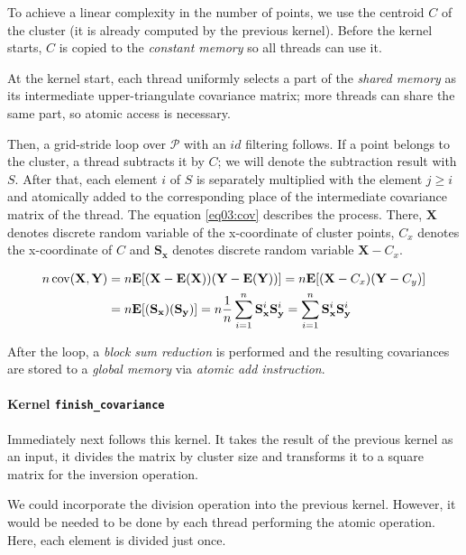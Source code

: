 To achieve a linear complexity in the number of points, we use the centroid $C$ of the cluster (it is already computed by the previous kernel). Before the kernel starts, $C$ is copied to the \emph{constant memory} so all threads can use it.

At the kernel start, each thread uniformly selects a part of the \emph{shared memory} as its intermediate upper-triangulate covariance matrix; more threads can share the same part, so atomic access is necessary.

Then, a grid-stride loop over $\mathcal{P}$ with an $id$ filtering follows. If a point belongs to the cluster, a thread subtracts it by $C$; we will denote the subtraction result with $S$. After that, each element $i$ of $S$ is separately multiplied with the element $j \ge i$ and atomically added to the corresponding place of the intermediate covariance matrix of the thread. The equation \ref{eq03:cov} describes the process. There, $\textbf{X}$ denotes discrete random variable of the x-coordinate of cluster points, $C_x$ denotes the x-coordinate of $C$ and $\mathbf{S_x}$ denotes discrete random variable $\mathbf{X}-C_x$.

\begin{equation}
\begin{split}
n\operatorname{cov}(\mathbf{X},\mathbf{Y}) &= n\mathbf{E}[(\mathbf{X}-\mathbf{E}(\mathbf{X}))(\mathbf{Y}-\mathbf{E}(\mathbf{Y}))] = n\mathbf{E}[(\mathbf{X}-C_x)(\mathbf{Y}-C_y)] \\ &= n\mathbf{E}[(\mathbf{S_x})(\mathbf{S_y})] = n\frac{1}{n}\sum_{i=1}^{n}{\mathbf{S}_{\mathbf{x}}^{i}\mathbf{S}_{\mathbf{y}}^{i}} = \sum_{i=1}^{n}{\mathbf{S}_{\mathbf{x}}^{i}\mathbf{S}_{\mathbf{y}}^{i}}
\end{split}
\label{eq03:cov}
\end{equation}

After the loop, a \emph{block sum reduction} is performed and the resulting covariances are stored to a \emph{global memory} via \emph{atomic add instruction}.

\paragraph{Kernel \texttt{finish\_covariance}}
Immediately next follows this kernel. It takes the result of the previous kernel as an input, it divides the matrix by cluster size and transforms it to a square matrix for the inversion operation.

We could incorporate the division operation into the previous kernel. However, it would be needed to be done by each thread performing the atomic operation. Here, each element is divided just once.

